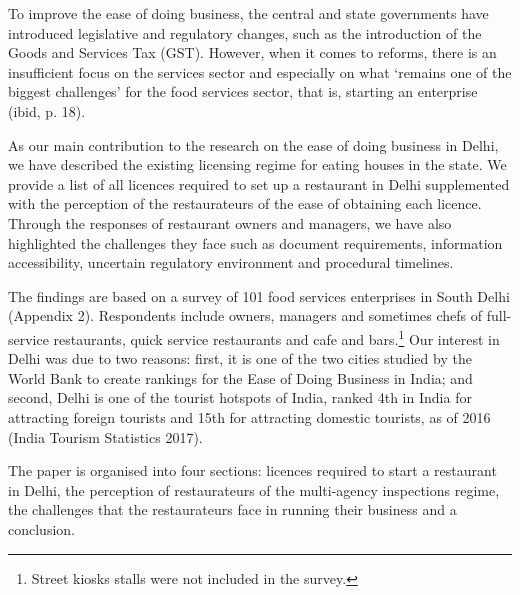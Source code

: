 \documentclass[a4paper, 12pt]{article}
\begin{document}
                    To improve the ease of doing business, the central and state governments have introduced legislative and regulatory changes, such as the introduction of the Goods and Services Tax (GST). However, when it comes to reforms, there is an insufficient focus on the services sector and especially on what ‘remains one of the biggest challenges’ for the food services sector, that is, starting an enterprise (ibid, p. 18).
                    
                    As our main contribution to the research on the ease of doing business in Delhi, we have described the existing licensing regime for eating houses in the state. We provide a list of all licences required to set up a restaurant in Delhi supplemented with the perception of the restaurateurs of the ease of obtaining each licence. Through the responses of restaurant owners and managers, we have also highlighted the challenges they face such as document requirements, information accessibility, uncertain regulatory environment and procedural timelines.
                    
                    The findings are based on a survey of 101 food services enterprises in South Delhi (Appendix 2). Respondents include owners, managers and sometimes chefs of full-service restaurants, quick service restaurants and cafe and bars.\footnote{Street kiosks stalls were not included in the survey.} Our interest in Delhi was due to two reasons: first, it is one of the two cities studied by the World Bank to create rankings for the Ease of Doing Business in India; and second, Delhi is one of the tourist hotspots of India, ranked 4th in India for attracting foreign tourists and 15th for attracting domestic tourists, as of 2016 (India Tourism Statistics 2017).
                    
                    The paper is organised into four sections: licences required to start a restaurant in Delhi, the perception of restaurateurs of the multi-agency inspections regime, the challenges that the restaurateurs face in running their business and a conclusion. 
            
                                        
\end{document}
